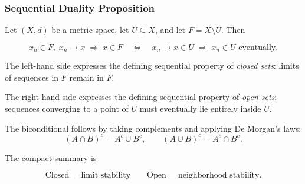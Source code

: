 \begin{center}
\end{center}

\subsubsection{Sequential Duality Proposition}

\begin{proposition}
\label{prop:sequential-duality}
Let $(X,d)$ be a metric space, let $U \subseteq X$, and let
$F = X \setminus U$.
Then

\[
x_n \in F,\; x_n \to x
\;\Rightarrow\;
x \in F
\quad\Longleftrightarrow\quad
x_n \to x \in U
\;\Rightarrow\;
x_n \in U \text{ eventually.}
\]
\end{proposition}

\begin{remark}
The left-hand side expresses the defining sequential property of
\emph{closed sets}: limits of sequences in $F$ remain in $F$.

The right-hand side expresses the defining sequential property of
\emph{open sets}: sequences converging to a point of $U$ must
eventually lie entirely inside $U$.

The biconditional follows by taking complements and applying De Morgan's
laws:
\[
(A \cap B)^c = A^c \cup B^c,
\qquad
(A \cup B)^c = A^c \cap B^c.
\]

The compact summary is

\[
\boxed{\text{Closed = limit stability}}
\qquad
\boxed{\text{Open = neighborhood stability.}}
\]
\end{remark}


